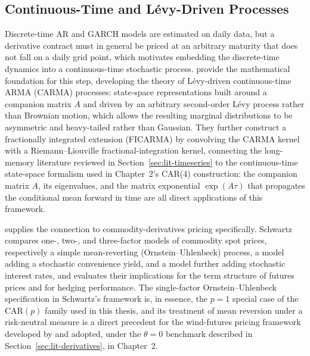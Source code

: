 ﻿\documentclass[11pt, a4paper, twoside]{article}
\begin{document}
\subsection{Continuous-Time and Lévy-Driven Processes}
\label{sec:lit-continuous}

Discrete-time AR and GARCH models are estimated on daily data, but a derivative contract must in general be priced at an arbitrary maturity that does not fall on a daily grid point, which motivates embedding the discrete-time dynamics into a continuous-time stochastic process. \citet{BrockwellMarquardt2005} provide the mathematical foundation for this step, developing the theory of Lévy-driven continuous-time ARMA (CARMA) processes: state-space representations built around a companion matrix $A$ and driven by an arbitrary second-order Lévy process rather than Brownian motion, which allows the resulting marginal distributions to be asymmetric and heavy-tailed rather than Gaussian. They further construct a fractionally integrated extension (FICARMA) by convolving the CARMA kernel with a Riemann--Liouville fractional-integration kernel, connecting the long-memory literature reviewed in Section~\ref{sec:lit-timeseries} to the continuous-time state-space formalism used in Chapter~2's CAR(4) construction: the companion matrix $A$, its eigenvalues, and the matrix exponential $\exp(A\tau)$ that propagates the conditional mean forward in time are all direct applications of this framework.

\citet{Schwartz1997} supplies the connection to commodity-derivatives pricing specifically. Schwartz compares one-, two-, and three-factor models of commodity spot prices, respectively a simple mean-reverting (Ornstein--Uhlenbeck) process, a model adding a stochastic convenience yield, and a model further adding stochastic interest rates, and evaluates their implications for the term structure of futures prices and for hedging performance. The single-factor Ornstein--Uhlenbeck specification in Schwartz's framework is, in essence, the $p=1$ special case of the CAR$(p)$ family used in this thesis, and its treatment of mean reversion under a risk-neutral measure is a direct precedent for the wind-futures pricing framework developed by \citet{BenthSaltyteBenth2009} and adopted, under the $\theta = 0$ benchmark described in Section~\ref{sec:lit-derivatives}, in Chapter~2.
\end{document}
